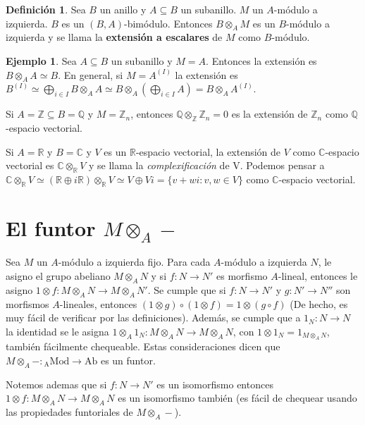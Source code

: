 \documentclass[12pt]{book}
\theoremstyle{definition}
\newtheorem{defn}[teo]{Definición}
\newtheorem{ex}[teo]{Ejemplo}
\newcommand{\CC}{\mathbb{C}}
\newcommand{\RR}{\mathbb{R}}      %
\newcommand{\ZZ}{\mathbb{Z}}      %
\newcommand{\QQ}{\mathbb{Q}}
\begin{document}
\begin{defn}
Sea $B$ un anillo y $A\subseteq B$ un subanillo. $M$ un $A$-módulo a izquierda. $B$ es un $(B,A)$-bimódulo. Entonces $B\otimes_A M$ es un $B$-módulo a izquierda y se llama la \textbf{extensión a escalares} de $M$ como $B$-módulo.
\end{defn}

\begin{ex}
Sea $A \subseteq B$ un subanillo y $M=A$. Entonces la extensión es $B\otimes_A A \simeq B$. En general, si $M=A^{(I)}$ la extensión es $B^{(I)}\simeq \displaystyle\bigoplus_{i\in I}B\otimes_A A \simeq B\otimes_A \left(\displaystyle\bigoplus_{i\in I}A\right) = B\otimes_A A^{(I)}$.

Si $A=\ZZ\subseteq B=\QQ$ y $M=\ZZ_n$, entonces $\QQ\otimes_{\ZZ} \ZZ_n = 0$ es la extensión de $\ZZ_n$ como $\QQ$-espacio vectorial.

Si $A=\RR$ y $B=\CC$ y $V$ es un $\RR$-espacio vectorial, la extensión de $V$ como $\CC$-espacio vectorial es $\CC\otimes_\RR V$ y se llama la \textit{complexificación} de V. Podemos pensar a $\CC\otimes_\RR V \simeq (\RR\oplus i\RR)\otimes_\RR V\simeq V\oplus Vi = \{v+wi : v,w\in V\}$ como $\CC$-espacio vectorial.
\end{ex}

\section{El funtor \texorpdfstring{$M\otimes_A -$}{MxA -}}

Sea $M$ un $A$-módulo a izquierda fijo. Para cada $A$-módulo a izquierda $N$, le asigno el grupo abeliano $M\otimes_A N$ y si $f:N\to N'$ es morfismo $A$-lineal, entonces le asigno $1\otimes f:M\otimes_A N\to M\otimes_A N'$. Se cumple que si $f:N\to N'$ y $g:N'\to N''$ son morfismos $A$-lineales, entonces $(1\otimes g)\circ (1\otimes f) = 1\otimes (g\circ f)$ (De hecho, es muy fácil de verificar por las definiciones). Además, se cumple que a $1_N:N\to N$ la identidad se le asigna $1\otimes_A 1_N :M\otimes_A N\to M\otimes_A N$, con $1\otimes 1_N = 1_{M\otimes_A N}$, también fácilmente chequeable. Estas consideraciones dicen que $M\otimes_A -:\mathrm{_AMod}\to\mathrm{Ab}$ es un funtor.

Notemos ademas que si $f:N\to N'$ es un isomorfismo entonces $1\otimes f:M\otimes_A N\to M\otimes_A N$ es un isomorfismo también (es fácil de chequear usando las propiedades funtoriales de $M\otimes_A -$).
\end{document}
